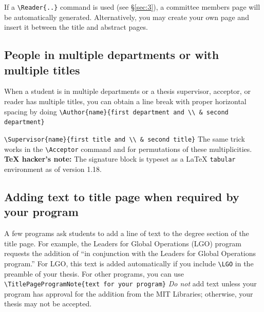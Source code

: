 \documentclass[11pt]{article}
\begin{document}
If a \verb|\Reader{..}| command is used (see \S\ref{sec:3}), a committee members page will be automatically generated.  Alternatively, you may create your own page and insert it between the title and abstract pages.


\subsection{People in multiple departments or with multiple titles}\label{sec:7.3}
When a student is in multiple departments or a thesis supervisor, acceptor, or reader has multiple titles, you can obtain a line break with proper horizontal spacing by doing
	\vskip 5pt
	\quad\verb|\Author{name}{first department and \\ & second department}|
	
	\quad\verb|\Supervisor{name}{first title and \\ & second title}|
	\vskip 5pt
\noindent The same trick works in the \verb|\Acceptor| command and for permutations of these multiplicities.
\textbf{\TeX{} hacker's note:} The signature block is typeset as a \LaTeX{} \texttt{tabular} environment as of version 1.18.


\subsection{Adding text to title page when required by your program}
A few programs ask students to add a line of text to the degree section of the title page.  For example, the Leaders for Global Operations (LGO) program requests the addition of ``in conjunction with the Leaders for Global Operations program.''  For LGO, this text is added automatically if you include \verb|\LGO| in the preamble of your thesis.  For other programs, you can use
	\vskip 5pt
	\quad\verb|\TitlePageProgramNote{text for your program}|
	\vskip 5pt
\textit{Do not} add text unless your program has approval for the addition from the MIT Libraries; otherwise, your thesis may not be accepted.
\end{document}
